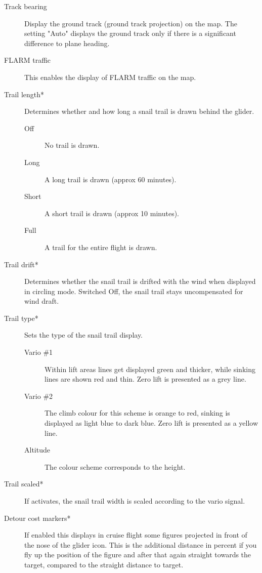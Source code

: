 \begin{description}
\item[Track bearing]  Display the ground track (ground track projection) on the map.
 The setting "Auto" displays the ground track only if there is a significant difference to plane heading.
\item[FLARM traffic]  \label{conf:flarm-on-map} This enables the display of FLARM traffic on the map.

\item[Trail length*] \label{conf:snailtrail} Determines whether and how long a
snail trail is drawn behind the glider.
\begin{description}
 \item[Off]  No trail is drawn.
 \item[Long]  A long trail is drawn (approx 60 minutes).
 \item[Short]  A short trail is drawn (approx 10 minutes).
 \item[Full]  A trail for the entire flight is drawn.
\end{description}

\item[Trail drift*] \label{conf:traildrift} Determines whether the
 snail trail is drifted with the wind when displayed in circling mode.  Switched Off,
 the snail trail stays uncompensated for wind draft.

\item[Trail type*] \label{conf:snailtype} Sets the type of the snail trail
display.
\begin{description}
 \item[Vario \#1]  Within lift areas lines get displayed green and
 thicker, while sinking lines are shown red and thin.  Zero lift
 is presented as a grey line.
 \item[Vario \#2]  The climb colour for this scheme is orange to red, sinking is
 displayed as light blue to dark blue. Zero lift
 is presented as a yellow line.
 \item[Altitude] The colour scheme corresponds to the height.
\end{description}

\item[Trail scaled*] \label{conf:trailscaled} If activates, the snail trail width 
 is scaled according to the vario signal.
\item[Detour cost markers*]  If enabled this displays in cruise flight some
 figures projected in front of the nose of the glider icon.  This is the
 additional distance in percent if you fly up the position of the figure and
 after that again straight towards the target, compared to the straight distance
 to target.


\end{description}
